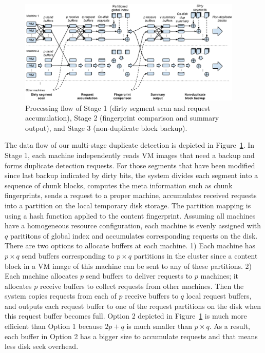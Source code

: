 \begin{figure}[tbhp]
\centering

\includegraphics[width=0.95\textwidth]{steps.pdf}
\caption{Processing flow of Stage  1 (dirty segment scan and request accumulation), Stage 2 
(fingerprint comparison and summary output),  and Stage 3 (non-duplicate block backup).}
\label{fig:flow}
\end{figure}

The data flow of our multi-stage duplicate detection is depicted in Figure~\ref{fig:flow}. 
In Stage 1, each machine independently reads  
VM images that need a backup
and forms duplicate  detection requests. For those segments that have been modified since last backup indicated by 
dirty bits,  the system divides  each segment into a sequence of chunk blocks,  computes the meta 
information such as chunk fingerprints,  sends a request to a proper machine, accumulates  
received requests into a partition on the local temporary disk storage. 
The partition mapping is using a hash function applied to the content fingerprint. 
Assuming all machines have a  homogeneous resource configuration, each machine is evenly  assigned with
$q$ parititons of global index and accumulates corresponding requests on the disk. 
There are two options to allocate buffers at each machine. 
1) Each machine has  $p\times q$ send buffers corresponding to $p\times q$ partitions in the cluster
since a content block in a VM image of this machine can be sent to any of these partitions.
2) Each machine allocates $p$ send buffers to deliver requests to $p$ machines; it allocates 
$p$ receive buffers to collect requests  from other machines.
Then the system copies requests from each of $p$ receive buffers to  $q$ local request buffers,
and outputs each request buffer to one of the request partitions on the disk
when this request buffer becomes full.  Option 2 depicted in Figure~\ref{fig:flow}
is much more efficient than Option 1 because $2p+q$ is much smaller than
$p\times q$. As a result, each buffer in Option 2 has a bigger size to accumulate requests and that means
less disk seek overhead.

